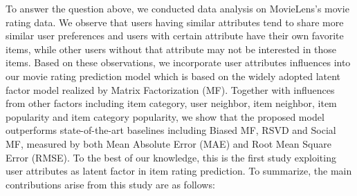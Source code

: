 \documentclass{llncs}
\begin{document}
	
	To answer the question above, we conducted data analysis on
	MovieLens's movie rating data. We observe that users having similar attributes tend to share more similar user
	preferences and users with certain attribute have their own favorite items, while other users without that attribute may not be interested in
	those items.
	Based on these observations, we incorporate user attributes influences into our movie rating prediction model which is based on
	the widely adopted latent factor model realized by Matrix Factorization (MF). Together with influences from other factors including
	item category, user neighbor, item neighbor, item popularity and item category popularity,
	we show that the proposed model outperforms state-of-the-art baselines including Biased MF, RSVD and Social MF\cite{SIGIR201301,4-1-1},
	measured by both Mean Absolute Error (MAE) and Root Mean Square Error (RMSE).
	To the best of our knowledge, this is the first study exploiting user attributes as latent factor in item rating
	prediction. To summarize, the main contributions arise from
	this study are as follows:
	
\end{document}
